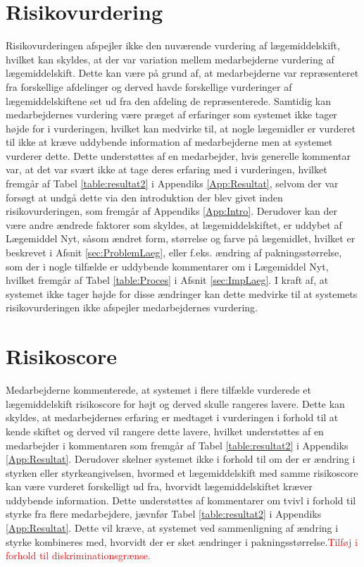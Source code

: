 \section{Risikovurdering}
Risikovurderingen afspejler ikke den nuværende vurdering af lægemiddelskift, hvilket kan skyldes, at der var variation mellem medarbejderne vurdering af lægemiddelskift. Dette kan være på grund af, at medarbejderne var repræsenteret fra forskellige afdelinger og derved havde forskellige vurderinger af lægemiddelskiftene set ud fra den afdeling de repræsenterede. Samtidig kan medarbejdernes vurdering være præget af erfaringer som systemet ikke tager højde for i vurderingen, hvilket kan medvirke til, at nogle lægemidler er vurderet til ikke at kræve uddybende information af medarbejderne men at systemet vurderer dette. Dette understøttes af en medarbejder, hvis generelle  kommentar var, at det var svært ikke at tage deres erfaring med i vurderingen, hvilket fremgår af Tabel \ref{table:resultat2} i Appendiks \ref{App:Resultat}, selvom der var forsøgt at undgå dette via den introduktion der blev givet inden risikovurderingen, som fremgår af Appendiks \ref{App:Intro}. Derudover kan der være andre ændrede faktorer som skyldes, at lægemiddelskiftet, er uddybet af Lægemiddel Nyt, såsom ændret form, størrelse og farve på lægemidlet, hvilket er beskrevet i Afsnit \ref{sec:ProblemLaeg}, eller f.eks. ændring af pakningsstørrelse, som der i nogle tilfælde er uddybende kommentarer om i Lægemiddel Nyt, hvilket fremgår af Tabel \ref{table:Proces} i Afsnit \ref{sec:ImpLaeg}. I kraft af, at systemet ikke tager højde for disse ændringer kan dette medvirke til at systemets risikovurderingen ikke afspejler medarbejdernes vurdering. 

\section{Risikoscore}
Medarbejderne kommenterede, at systemet i flere tilfælde vurderede et lægemiddelskift risikoscore for højt og derved skulle rangeres lavere. Dette kan skyldes, at medarbejdernes erfaring er medtaget i vurderingen i forhold til at kende skiftet og derved vil rangere dette lavere, hvilket understøttes af en medarbejder i kommentaren som fremgår af Tabel \ref{table:resultat2} i Appendiks \ref{App:Resultat}. Derudover skelner systemet ikke i forhold til om der er ændring i styrken eller  styrkeangivelsen, hvormed et lægemiddelskift med samme risikoscore kan være vurderet forskelligt ud fra, hvorvidt lægemiddelskiftet kræver uddybende information. Dette understøttes af kommentarer om tvivl i forhold til styrke fra flere medarbejdere, jævnfør Tabel \ref{table:resultat2} i Appendiks \ref{App:Resultat}. Dette vil kræve, at systemet ved sammenligning af ændring i styrke kombineres med, hvorvidt der er sket ændringer i pakningsstørrelse.\textcolor{red}{Tilføj i forhold til diskriminationsgrænse.}

